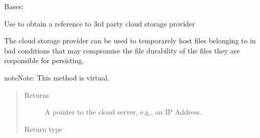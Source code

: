 \documentclass[letterpaper,10pt,english]{sphinxmanual}
\begin{document}
\begin{fulllineitems}
\label{\detokenize{app.domain:app.domain.master_servers.SGMaster}}
Bases: {\hyperref[\detokenize{app.domain:app.domain.master_servers.Master}]{}}

\begin{fulllineitems}
\label{\detokenize{app.domain:app.domain.master_servers.SGMaster.get_cloud_reference}}
Use to obtain a reference to 3rd party cloud storage provider

The cloud storage provider can be used to temporarely host files
belonging to  in bad
conditions that may compromise the file durability of the files they
are responsible for persisting.

\begin{sphinxadmonition}{note}{Note:}
This method is virtual.
\end{sphinxadmonition}
\begin{quote}\begin{description}
\item[{Returns}] \leavevmode
A pointer to the cloud server, e.g., an IP Address.

\item[{Return type}] \leavevmode
{}

\end{description}\end{quote}

\end{fulllineitems}


\end{fulllineitems}


\begin{fulllineitems}
\label{\detokenize{app.domain:app.domain.master_servers._PersistentingDict}}
\end{fulllineitems}
\end{document}

